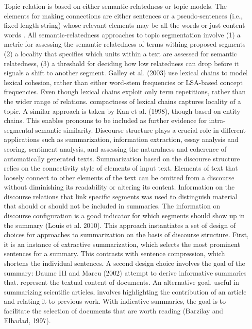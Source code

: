 Topic relation is based on either semantic-relatedness or topic models. 
The elements for making connections are either sentences or a pseudo-sentences (i.e., fixed length string) whose relevant elements may be all the words or just content words .
All semantic-relatedness approaches to topic segmentation involve (1) a metric for assessing the semantic relatedness of terms withing proposed segments (2) a locality that specifies which units within a text are assessed for semantic relatedness, (3) a threshold for deciding how low relatedness can drop before it signals a shift to another segment.
Galley et al. (2003) use lexical chains to model lexical cohesion, rather than either word-stem frequencies or LSA-based concept frequencies.
Even though lexical chains exploit only term repetitions, rather than the wider range of relations. 
compactness of lexical chains captures locality of a topic. 
A similar approach is taken by Kan et al. (1998), though based on entity chains. 
This enables pronouns to be included as further evidence for intra-segmental semantic similarity. 
Discourse structure plays a crucial role in different applications such as summarization, information extraction, essay analysis and scoring, 
sentiment analysis, and assessing the naturalness and coherence of automatically generated texts. 
Summarization based on the discourse structure relies on the connectivity style of elements of input text. 
Elements of text that loosely connect to other elements of the text can be omitted from a discourse without diminishing its readability or altering its content. 
Information on the discourse relations that link specific segments was used to distinguish material that should or should not be included in summaries. 
The information on discourse configuration is a good indicator for which segments should show up in the summary (Louis et al. 2010). 
This approach instantiates a set of design of choices for approaches to summarization on the basis of discourse structure.
First, it is an instance of extractive summarization, which selects the most prominent sentences for a summary.
This contrasts with sentence compression, which shortens the individual sentences. 
A second design choice involves the goal of the summary: Daume III and Marcu (2002) attempt to derive informative summaries that. represent the textual content of documents. 
An alternative goal, useful in summarizing scientific articles, involves highlighting the contribution of an article and relating it to previous work. 
With indicative summaries, the goal is to facilitate the selection of documents that are worth reading (Barzilay and Elhadad, 1997). 
